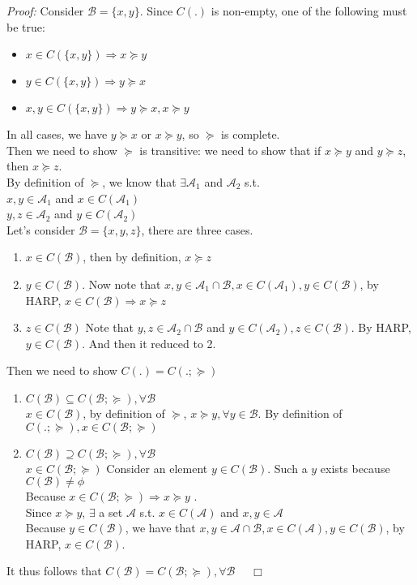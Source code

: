 \documentclass[11pt]{article}
\newenvironment{proof}{\noindent\emph{Proof:}}{$\quad \Box$}
\begin{document}
\begin{proof}
  Consider $\mathcal{B}=\{x,y\}$. Since $C(.)$ is non-empty, one of the following must be true:
  \begin{itemize}
  \item $x \in C(\{x,y\}) \Rightarrow x\succeq y$
  \item $y \in C(\{x,y\}) \Rightarrow y\succeq x$
   \item $x, y \in C(\{x,y\}) \Rightarrow y\succeq x , x\succeq y$
  \end{itemize}
  In all cases, we have $y\succeq x$ or $ x\succeq y$, so $\succeq$ is complete.\\
  Then we need to show $\succeq$ is transitive: we need to show that if $x\succeq y$ and $y\succeq z$, then $x\succeq z$.\\
  By definition of $\succeq$, we know that $\exists \mathcal{A}_1$ and $\mathcal{A}_2$ s.t. \\
  $x, y \in \mathcal{A}_1 $ and $x \in C(\mathcal{A}_1)$ \\
    $y, z \in \mathcal{A}_2 $ and $y \in C(\mathcal{A}_2)$ \\
    Let's consider $\mathcal{B}=\{x, y, z\}$, there are three cases.
    \begin{enumerate}
    \item $x \in C(\mathcal{B})$, then by definition, $x \succeq z$
    \item $y \in C(\mathcal{B})$. Now note that $x, y \in \mathcal{A}_1\cap \mathcal{B}, x\in C(\mathcal{A}_1), y \in C(\mathcal{B})$, by HARP, $x \in C(\mathcal{B}) \Longrightarrow x \succeq z$
    \item $z \in C(\mathcal{B})$ Note that $y, z \in \mathcal{A}_2 \cap \mathcal{B}$ and $y \in C(\mathcal{A}_2), z \in C(\mathcal{B})$. By HARP, $y \in C(\mathcal{B})$. And then it reduced to 2.
    \end{enumerate}
Then we need to show $C(.)=C(.;\succeq)$
\begin{enumerate}
\item $C(\mathcal{B}) \subseteq C(\mathcal{B}; \succeq), \forall \mathcal{B} $\\
    $x \in C(\mathcal{B}) $, by definition of $\succeq$, $x\succeq y, \forall y \in \mathcal{B}$. By definition of $C(.;\succeq), x\in C(\mathcal{B};\succeq)  $
\item $C(\mathcal{B}) \supseteq C(\mathcal{B}; \succeq), \forall \mathcal{B} $\\
    $x \in C(\mathcal{B};\succeq)$ Consider an element $y \in C(\mathcal{B})$. Such a $y$ exists because $C(\mathcal{B})\neq \phi$\\
    Because $x \in C(\mathcal{B};\succeq) \Longrightarrow x \succeq y$ .\\
    Since $x \succeq y$, $\exists$ a set $\mathcal{A}$ s.t. $x \in C(\mathcal{A})$ and $x, y \in \mathcal{A}$\\
    Because $y \in C(\mathcal{B})$, we have that $x, y \in \mathcal{A} \cap \mathcal{B}, x \in C(\mathcal{A}), y \in C(\mathcal{B})$, by HARP, $x \in C(\mathcal{B})$.
    \end{enumerate}
    It thus follows that  $C(\mathcal{B}) = C(\mathcal{B}; \succeq), \forall \mathcal{B} $
\end{proof}
\end{document}
